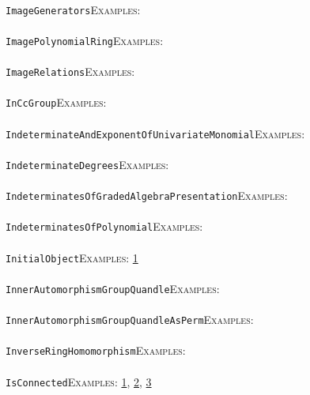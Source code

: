 \documentclass[a4paper,11pt]{report}
\begin{document}
{{ \\
 \texttt{ImageGenerators}{\nobreakspace}{\nobreakspace}{\nobreakspace}{\nobreakspace}\textsc{Examples:} \\
 \\
 \texttt{ImagePolynomialRing}{\nobreakspace}{\nobreakspace}{\nobreakspace}{\nobreakspace}\textsc{Examples:} \\
 \\
 \texttt{ImageRelations}{\nobreakspace}{\nobreakspace}{\nobreakspace}{\nobreakspace}\textsc{Examples:} \\
 \\
 \texttt{InCcGroup}{\nobreakspace}{\nobreakspace}{\nobreakspace}{\nobreakspace}\textsc{Examples:} \\
 \\
 \texttt{IndeterminateAndExponentOfUnivariateMonomial}{\nobreakspace}{\nobreakspace}{\nobreakspace}{\nobreakspace}\textsc{Examples:} \\
 \\
 \texttt{IndeterminateDegrees}{\nobreakspace}{\nobreakspace}{\nobreakspace}{\nobreakspace}\textsc{Examples:} \\
 \\
 \texttt{IndeterminatesOfGradedAlgebraPresentation}{\nobreakspace}{\nobreakspace}{\nobreakspace}{\nobreakspace}\textsc{Examples:} \\
 \\
 \texttt{IndeterminatesOfPolynomial}{\nobreakspace}{\nobreakspace}{\nobreakspace}{\nobreakspace}\textsc{Examples:} \\
 \\
 \texttt{InitialObject}{\nobreakspace}{\nobreakspace}{\nobreakspace}{\nobreakspace}\textsc{Examples:} \href{../www/SideLinks/About/aboutAbelianCategories.html} {1}{\nobreakspace} \\
 \\
 \texttt{InnerAutomorphismGroupQuandle}{\nobreakspace}{\nobreakspace}{\nobreakspace}{\nobreakspace}\textsc{Examples:} \\
 \\
 \texttt{InnerAutomorphismGroupQuandleAsPerm}{\nobreakspace}{\nobreakspace}{\nobreakspace}{\nobreakspace}\textsc{Examples:} \\
 \\
 \texttt{InverseRingHomomorphism}{\nobreakspace}{\nobreakspace}{\nobreakspace}{\nobreakspace}\textsc{Examples:} \\
 \\
 \texttt{IsConnected}{\nobreakspace}{\nobreakspace}{\nobreakspace}{\nobreakspace}\textsc{Examples:} \href{../www/SideLinks/About/aboutQuandles2.html} {1}{\nobreakspace}, \href{../www/SideLinks/About/aboutQuandles.html} {2}{\nobreakspace}, \href{../www/SideLinks/About/aboutKnotsQuandles.html} {3}{\nobreakspace} \\
}}
\end{document}
